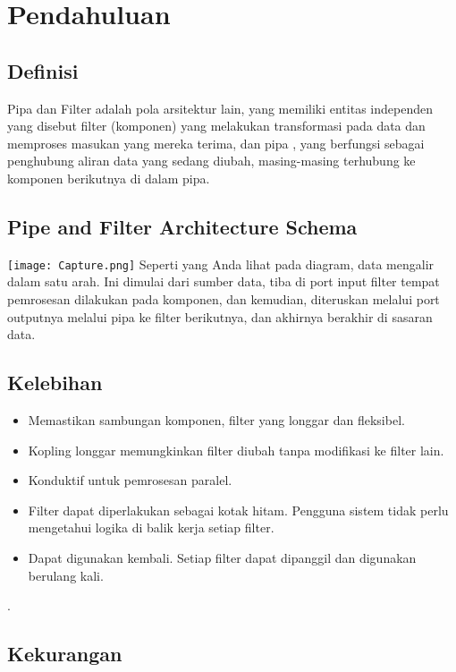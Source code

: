 \chapter{Pendahuluan}

	\section{Definisi}
	Pipa dan Filter adalah pola arsitektur lain, yang memiliki entitas independen yang disebut filter (komponen) yang melakukan transformasi pada data dan memproses masukan yang mereka terima, dan pipa , yang berfungsi sebagai penghubung aliran data yang sedang diubah, masing-masing terhubung ke komponen berikutnya di dalam pipa.
	
	\section{Pipe and Filter Architecture Schema
	}
	\texttt{[image: Capture.png]}
	Seperti yang Anda lihat pada diagram, data mengalir dalam satu arah. Ini dimulai dari sumber data, tiba di port input filter tempat pemrosesan dilakukan pada komponen, dan kemudian, diteruskan melalui port outputnya melalui pipa ke filter berikutnya, dan akhirnya berakhir di sasaran data.

	\section{Kelebihan}
	
	\begin{itemize}
		\item Memastikan sambungan komponen, filter yang longgar dan fleksibel.
		\item Kopling longgar memungkinkan filter diubah tanpa modifikasi ke filter lain.
		\item Konduktif untuk pemrosesan paralel.
		\item Filter dapat diperlakukan sebagai kotak hitam. Pengguna sistem tidak perlu mengetahui logika di balik kerja setiap filter.
		\item Dapat digunakan kembali. Setiap filter dapat dipanggil dan digunakan berulang kali.
	\end{itemize}
.
	
	
	\section{Kekurangan}
	
